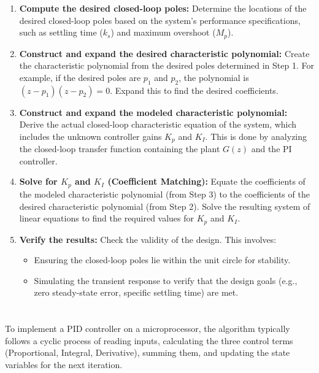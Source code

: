 \documentclass[a4paper,12pt]{article}
\begin{document}
\begin{enumerate}
    \item \textbf{Compute the desired closed-loop poles:}
    Determine the locations of the desired closed-loop poles based on the system's performance specifications, such as settling time ($k_s$) and maximum overshoot ($M_p$).

    \item \textbf{Construct and expand the desired characteristic polynomial:}
    Create the characteristic polynomial from the desired poles determined in Step 1. For example, if the desired poles are $p_1$ and $p_2$, the polynomial is $(z - p_1)(z - p_2) = 0$. Expand this to find the desired coefficients.

    \item \textbf{Construct and expand the modeled characteristic polynomial:}
    Derive the actual closed-loop characteristic equation of the system, which includes the unknown controller gains $K_p$ and $K_I$. This is done by analyzing the closed-loop transfer function containing the plant $G(z)$ and the PI controller.

    \item \textbf{Solve for $K_p$ and $K_I$ (Coefficient Matching):}
    Equate the coefficients of the modeled characteristic polynomial (from Step 3) to the coefficients of the desired characteristic polynomial (from Step 2). Solve the resulting system of linear equations to find the required values for $K_p$ and $K_I$.

    \item \textbf{Verify the results:}
    Check the validity of the design. This involves:
    \begin{itemize}
        \item Ensuring the closed-loop poles lie within the unit circle for stability.
        \item Simulating the transient response to verify that the design goals (e.g., zero steady-state error, specific settling time) are met.
    \end{itemize}
\end{enumerate}


\section{}

To implement a PID controller on a microprocessor, the algorithm typically follows a cyclic process of reading inputs, calculating the three control terms (Proportional, Integral, Derivative), summing them, and updating the state variables for the next iteration.
\end{document}
